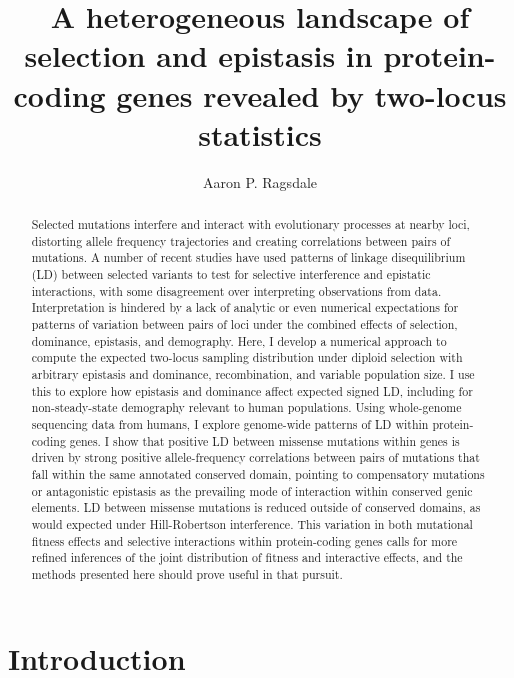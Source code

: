 \documentclass[]{article}
\begin{document}
\title{A heterogeneous landscape of selection and epistasis in protein-coding genes revealed by two-locus statistics}
\author[]{Aaron P. Ragsdale}
\maketitle


\begin{abstract}

Selected mutations interfere and interact with evolutionary processes at nearby
loci, distorting allele frequency trajectories and creating correlations
between pairs of mutations. A number of recent studies have used patterns of
linkage disequilibrium (LD) between selected variants to test for selective
interference and epistatic interactions, with some disagreement over
interpreting observations from data. Interpretation is hindered by a lack of
analytic or even numerical expectations for patterns of variation between pairs
of loci under the combined effects of selection, dominance, epistasis, and
demography. Here, I develop a numerical approach to compute the expected
two-locus sampling distribution under diploid selection with arbitrary
epistasis and dominance, recombination, and variable population size. I use
this to explore how epistasis and dominance affect expected signed LD,
including for non-steady-state demography relevant to human populations. Using
whole-genome sequencing data from humans, I explore genome-wide patterns of LD
within protein-coding genes. I show that positive LD between missense mutations
within genes is driven by strong positive allele-frequency correlations between
pairs of mutations that fall within the same annotated conserved domain,
pointing to compensatory mutations or antagonistic epistasis as the prevailing
mode of interaction within conserved genic elements. LD between missense
mutations is reduced outside of conserved domains, as would expected under
Hill-Robertson interference. This variation in both mutational fitness effects
and selective interactions within protein-coding genes calls for more refined
inferences of the joint distribution of fitness and interactive effects, and
the methods presented here should prove useful in that pursuit.

\end{abstract}

\section{Introduction}\label{sec:introduction}
\end{document}

